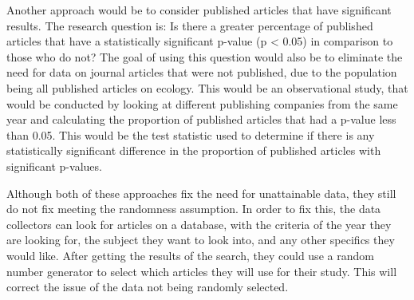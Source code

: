 \documentclass[12pt, letterpaper]{article}
\begin{document}
Another approach would be to consider published articles that have significant results. The research question is: Is there a greater percentage of published articles that have a statistically significant p-value (p < 0.05) in comparison to those who do not? The goal of using this question would also be to  eliminate the need for data on journal articles that were not published, due to the population being all published articles on ecology. This would be an observational study, that would be conducted by looking at different publishing companies from the same year and calculating the proportion of published articles that had a p-value less than 0.05. This would be the test statistic used to determine if there is any statistically significant difference in the proportion of published articles with significant p-values. 

Although both of these approaches fix the need for unattainable data, they still do not fix meeting the randomness assumption. In order to fix this, the data collectors can look for articles on a database, with the criteria of the year they are looking for, the subject they want to look into, and any other specifics they would like. After getting the results of the search, they could use a random number generator to select which articles they  will use for their study. This will correct the issue of the data not being randomly selected.
\end{document}

